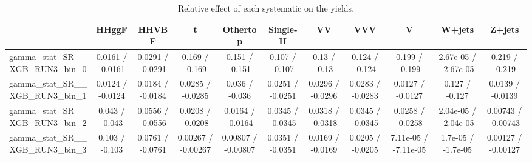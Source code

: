\documentclass[10pt]{article}
\begin{document}
\begin{table}[htbp]
\begin{center}
\begin{tabular}{|c|c|c|c|c|c|c|c|c|c|c|}
\hline 
      & HHggF      & HHVBF      & t      & Othertop      & Single-H      & VV      & VVV      & V      & W+jets      & Z+jets \\ 
\hline 
  gamma_stat_SR__XGB_RUN3_bin_0 & 0.0161 / -0.0161 & 0.0291 / -0.0291 & 0.169 / -0.169 & 0.151 / -0.151 & 0.107 / -0.107 & 0.13 / -0.13 & 0.124 / -0.124 & 0.199 / -0.199 & 2.67e-05 / -2.67e-05 & 0.219 / -0.219 \\ 
  gamma_stat_SR__XGB_RUN3_bin_1 & 0.0124 / -0.0124 & 0.0184 / -0.0184 & 0.0285 / -0.0285 & 0.036 / -0.036 & 0.0251 / -0.0251 & 0.0296 / -0.0296 & 0.0283 / -0.0283 & 0.0127 / -0.0127 & 0.127 / -0.127 & 0.0139 / -0.0139 \\ 
  gamma_stat_SR__XGB_RUN3_bin_2 & 0.043 / -0.043 & 0.0556 / -0.0556 & 0.0208 / -0.0208 & 0.0164 / -0.0164 & 0.0345 / -0.0345 & 0.0318 / -0.0318 & 0.0345 / -0.0345 & 0.0258 / -0.0258 & 2.04e-05 / -2.04e-05 & 0.00743 / -0.00743 \\ 
  gamma_stat_SR__XGB_RUN3_bin_3 & 0.103 / -0.103 & 0.0761 / -0.0761 & 0.00267 / -0.00267 & 0.00807 / -0.00807 & 0.0351 / -0.0351 & 0.0169 / -0.0169 & 0.0205 / -0.0205 & 7.11e-05 / -7.11e-05 & 1.7e-05 / -1.7e-05 & 0.00127 / -0.00127 \\ 
\hline 
\end{tabular} 
\caption{Relative effect of each systematic on the yields.} 
\end{center} 
\end{table} 
\end{document}
